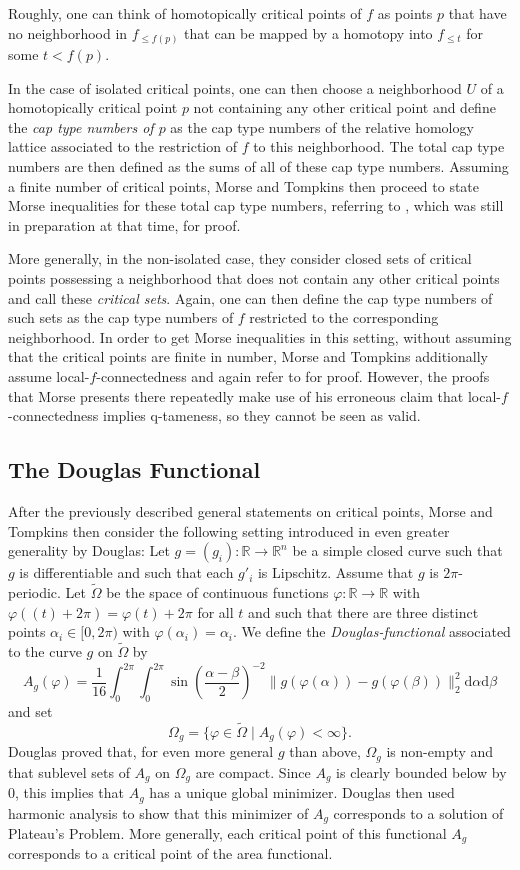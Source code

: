 Roughly, one can think of homotopically critical points of $f$ as points $p$ that have no neighborhood in $f_{\leq f(p)}$ that can be mapped by a homotopy into $f_{\leq t}$ for some $t<f(p)$.

In the case of isolated critical points, one can then choose a neighborhood $U$ of a homotopically critical point $p$ not containing any other critical point and define the \emph{cap type numbers of $p$} as the cap type numbers of the relative homology lattice associated to the restriction of $f$ to this neighborhood. The total cap type numbers are then defined as the sums of all of these cap type numbers. Assuming a finite number of critical points, Morse and Tompkins then proceed to state Morse inequalities for these total cap type numbers, referring to \cite{Morse.1940}, which was still in preparation at that time, for proof. 

More generally, in the non-isolated case, they consider closed sets of critical points possessing a neighborhood that does not contain any other critical points and call these \emph{critical sets}. Again, one can then define the cap type numbers of such sets as the cap type numbers of $f$ restricted to the corresponding neighborhood. In order to get Morse inequalities in this setting, without assuming that the critical points are finite in number, Morse and Tompkins additionally assume local-$f$-connectedness and again refer to \cite{Morse.1940} for proof. However, the proofs that Morse presents there repeatedly make use of his erroneous claim that local-$f$-connectedness implies q-tameness, so they cannot be seen as valid.


\subsection{The Douglas Functional}
After the previously described general statements on critical points, Morse and Tompkins then consider the following setting introduced in even greater generality by Douglas: Let $g=(g_i)\colon\mathbb{R}\to\mathbb{R}^n$ be a simple closed curve such that $g$ is differentiable and such that each $g'_i$ is Lipschitz. Assume that $g$ is $2\pi$-periodic. Let $\tilde{\Omega}$ be the space of continuous functions $\varphi\colon\mathbb{R}\to\mathbb{R}$ with $\varphi((t)+2\pi)=\varphi(t)+2\pi$ for all $t$ and such that there are three distinct points $\alpha_i\in[0,2\pi)$ with $\varphi(\alpha_i)=\alpha_i$. We define the \emph{Douglas-functional} associated to the curve $g$ on $\tilde{\Omega}$ by $$A_g(\varphi)=\frac{1}{16}\int_0^{2\pi}\int_0^{2\pi}\sin\left(\frac{\alpha-\beta}{2}\right)^{-2}\lVert g(\varphi(\alpha))-g(\varphi(\beta)) \rVert_2^2\mathrm{d}\alpha\mathrm{d}\beta$$ and set $$\Omega_g=\{\varphi\in\tilde\Omega\mid A_g(\varphi)<\infty\}.$$ Douglas proved that, for even more general $g$ than above, $\Omega_g$ is non-empty and that sublevel sets of $A_g$ on $\Omega_g$ are compact. Since $A_g$ is clearly bounded below by $0$, this implies that $A_g$ has a unique global minimizer. Douglas then used harmonic analysis to show that this minimizer of $A_g$ corresponds to a solution of Plateau's Problem. More generally, each critical point of this functional $A_g$ corresponds to a critical point of the area functional. 

